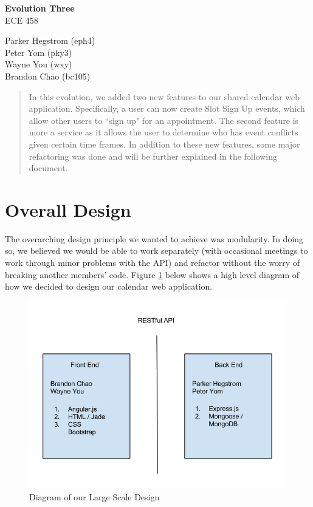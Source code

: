 \documentclass[11pt]{article}   %
\begin{document}
\begin{center}

\vspace{3in}
{\Huge{\bf\sc Evolution Three}}\\
\vspace{.1in}
{\small\sc ECE 458}


\vspace{0.3in}



{\large\sc Parker Hegstrom} {\large (eph4)} \\
{\large\sc Peter Yom} {\large (pky3)} \\
{\large\sc Wayne You} {\large (wxy)} \\
{\large\sc Brandon Chao} {\large (bc105)} \\


\end{center}


\vspace{0.2in}

\begin{abstract}
In this evolution, we added two new features to our shared calendar web application. Specifically, a user can now create Slot Sign Up events, which allow other users to ``sign up" for an appointment. The second feature is more a service as it allows the user to determine who has event conflicts given certain time frames. In addition to these new features, some major refactoring was done and will be further explained in the following document.
\end{abstract}

\tableofcontents


\pagebreak


\section{Overall Design}

The overarching design principle we wanted to achieve was modularity. In doing so, we believed we would be able to work separately (with occasional meetings to work through minor problems with the API) and refactor without the worry of breaking another members' code. Figure \ref{design} below shows a high level diagram of how we decided to design our calendar web application.

\begin{figure}[htb]
\centering
\includegraphics[width=.5\textwidth]{DesignDiagram.png}
\caption{Diagram of our Large Scale Design}
\label{design}
\end{figure}
\end{document}
